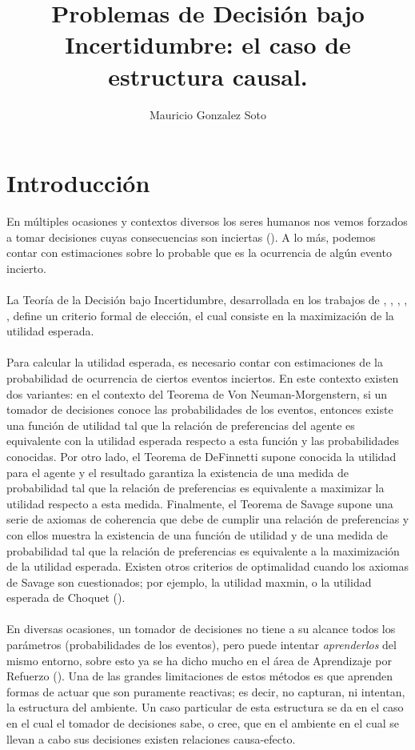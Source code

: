 \documentclass[11pt]{article}
\title{Problemas de Decisión bajo Incertidumbre: el caso de estructura causal.}
\author{Mauricio Gonzalez Soto}
\theoremstyle{plain}
\begin{document}
\maketitle
\section{Introducción}
En múltiples ocasiones y contextos diversos los seres humanos nos vemos forzados a tomar decisiones cuyas consecuencias son inciertas (\cite{danks2014unifying}). A lo más, podemos contar con estimaciones sobre lo probable que es la ocurrencia de algún evento incierto.\\
\\
La Teoría de la Decisión bajo Incertidumbre, desarrollada en los trabajos de \cite{von1944theory}, \cite{definetti1930}, \cite{definetti1937}, \cite{savage1954the}, \cite{bernardo2000bayesian}, define un criterio formal de elección, el cual consiste en la maximización de la utilidad esperada.\\
\\
Para calcular la utilidad esperada, es necesario contar con estimaciones de la probabilidad de ocurrencia de ciertos eventos inciertos. En este contexto existen dos variantes: en el contexto del Teorema de Von Neuman-Morgenstern, si un tomador de decisiones conoce las probabilidades de los eventos, entonces existe una función de utilidad tal que la relación de preferencias del agente es equivalente con la utilidad esperada respecto a esta función y las probabilidades conocidas. Por otro lado, el Teorema de DeFinnetti supone conocida la utilidad para el agente y el resultado garantiza la existencia de una medida de probabilidad tal que la relación de preferencias es equivalente a maximizar la utilidad respecto a esta medida. Finalmente, el Teorema de Savage supone una serie de axiomas de coherencia que debe de cumplir una relación de preferencias y con ellos muestra la existencia de una función de utilidad y de una medida de probabilidad tal que la relación de preferencias es equivalente a la maximización de la utilidad esperada. Existen otros criterios de optimalidad cuando los axiomas de Savage son cuestionados; por ejemplo, la utilidad maxmin, o la utilidad esperada de Choquet (\cite{gilboa2009decision}).\\
\\
En diversas ocasiones, un tomador de decisiones no tiene a su alcance todos los parámetros (probabilidades de los eventos), pero puede intentar \textit{aprenderlos} del mismo entorno, sobre esto ya se ha dicho mucho en el área de Aprendizaje por Refuerzo (\cite{sutton1998reinforcement}). Una de las grandes limitaciones de estos métodos es que aprenden formas de actuar que son puramente reactivas; es decir, no capturan, ni intentan, la estructura del ambiente. Un caso particular de esta estructura se da en el caso en el cual el tomador de decisiones sabe, o cree, que en el ambiente en el cual se llevan a cabo sus decisiones existen relaciones causa-efecto.
\end{document}
